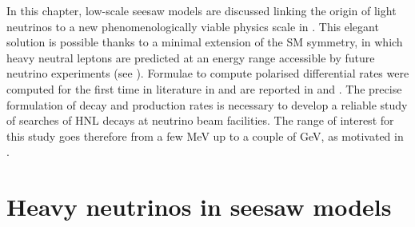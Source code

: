 In this chapter, low-scale seesaw models are discussed linking the origin of light neutrinos to %
a new phenomenologically viable physics scale in .
This elegant solution is possible thanks to a minimal extension of the SM symmetry, %
in which heavy neutral leptons are predicted at an energy range accessible by future neutrino experiments (see ).
Formulae to compute polarised differential rates were computed for the first time in literature %
in  and are reported in  and .
The precise formulation of decay and production rates is necessary %
to develop a reliable study of searches of HNL decays at neutrino beam facilities.
The range of interest for this study goes therefore from a few MeV up to a couple of GeV, %
as motivated in .

\section{Heavy neutrinos in seesaw models}
\label{sec:model}

